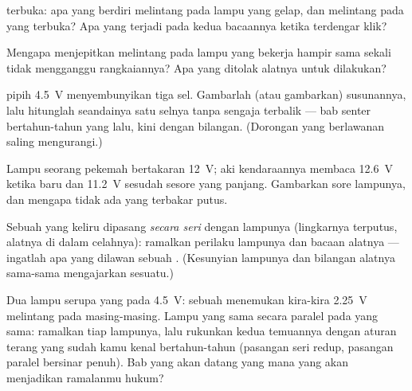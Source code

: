 \begin{exercise}[$\star$]\label{exo:g8:voltage-voltmeter:7}
 terbuka: apa yang berdiri melintang pada lampu yang gelap, dan
melintang pada  yang terbuka? Apa yang terjadi pada kedua
bacaannya ketika terdengar  klik?
\end{exercise}

\begin{exercise}[$\star$]\label{exo:g8:voltage-voltmeter:8}
Mengapa menjepitkan  melintang pada lampu yang bekerja hampir
sama sekali tidak mengganggu rangkaiannya? Apa yang ditolak alatnya
untuk dilakukan?
\end{exercise}

\begin{exercise}[$\star\star$]\label{exo:g8:voltage-voltmeter:9}
 pipih \qty{4.5}{V} menyembunyikan tiga sel. Gambarlah (atau
gambarkan) susunannya, lalu hitunglah  seandainya satu
selnya tanpa sengaja terbalik --- bab senter bertahun-tahun yang lalu,
kini dengan bilangan. (Dorongan yang berlawanan saling mengurangi.)
\end{exercise}

\begin{exercise}[$\star\star$]\label{exo:g8:voltage-voltmeter:10}
Lampu seorang pekemah bertakaran \qty{12}{V}; aki kendaraannya membaca
\qty{12.6}{V} ketika baru dan \qty{11.2}{V} sesudah sesore yang
panjang. Gambarkan sore lampunya, dan mengapa tidak ada yang terbakar
putus.
\end{exercise}

\begin{exercise}[$\star\star$]\label{exo:g8:voltage-voltmeter:11}
Sebuah  yang keliru dipasang \emph{secara seri} dengan
lampunya (lingkarnya terputus, alatnya di dalam celahnya): ramalkan
perilaku lampunya dan bacaan alatnya --- ingatlah apa yang dilawan
sebuah . (Kesunyian lampunya dan bilangan alatnya
sama-sama mengajarkan sesuatu.)
\end{exercise}

\begin{exercise}[$\star\star\star$]\label{exo:g8:voltage-voltmeter:12}
Dua lampu serupa yang  pada \qty{4.5}{V}: sebuah
 menemukan kira-kira \qty{2.25}{V} melintang pada
masing-masing. Lampu yang sama secara paralel pada  yang sama:
ramalkan  tiap lampunya, lalu rukunkan kedua temuannya dengan
aturan terang yang sudah kamu kenal bertahun-tahun (pasangan seri
redup, pasangan paralel bersinar penuh). Bab yang akan datang yang
mana yang akan menjadikan ramalanmu hukum?
\end{exercise}


